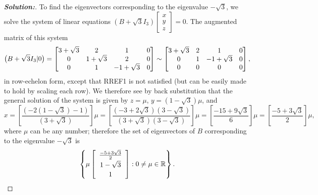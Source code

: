 \documentclass[a4paper]{amsart}
\theoremstyle{definition}
\newenvironment{solution}{\begin{proof}[\textbf{Solution:}] \vphantom{u}}{\end{proof}}
\begin{document}
\begin{solution}
 To find the eigenvectors corresponding to the eigenvalue
 $-\sqrt{3}$, we solve the system of linear equations $(B +
 \sqrt{3}I_3)\left[
 \begin{array}{c}x \\ y\\z
 \end{array} \right] = 0$. The augmented matrix of this system
 \[
 \big(B + \sqrt{3}I_3|0\big) = \left[\begin{matrix} 3+\sqrt{3}& 2&
 1&0\\0&1+\sqrt{3}&2&0\\0&1&-1+\sqrt{3}&0\end{matrix}\right] \sim
 \left[\begin{matrix} 3+\sqrt{3}& 2&
 1&0\\0&1&-1+\sqrt{3}&0\\0&0&0&0\end{matrix}\right],
 \]
 in row-echelon form, except that RREF1 is not satisfied (but
 can be easily made to hold by scaling each row).
 We therefore see by back substitution that
 the general solution of the system is given by $z = \mu$, $y =
 (1-\sqrt{3})\mu$, and
 \[
 {\textstyle x =
 \left[\frac{(-2(1-\sqrt{3})-1)}{(3+\sqrt{3})}\right]\mu =
 \left[\frac{(-3
 +2\sqrt{3})(3-\sqrt{3})}{(3+\sqrt{3})(3-\sqrt{3})}\right]\mu =
 \left[\frac{-15+9\sqrt{3}}{6}\right]\mu =
 \left[\frac{-5+3\sqrt{3}}{2}\right]\mu,}
 \]
 where $\mu$ can be any number; therefore the set of eigenvectors
 of $B$ corresponding to the eigenvalue $-\sqrt{3}$ is
 \[
 \left\{ \mu \left[ \begin{array}{c}
 \frac{-5+3\sqrt{3}}{2}\\[2pt]1-\sqrt{3}\\[2pt]1
 \end{array} \right] : 0 \neq \mu \in {\mathbb{R}} \right\}.
 \]
\end{solution}
\end{document}
